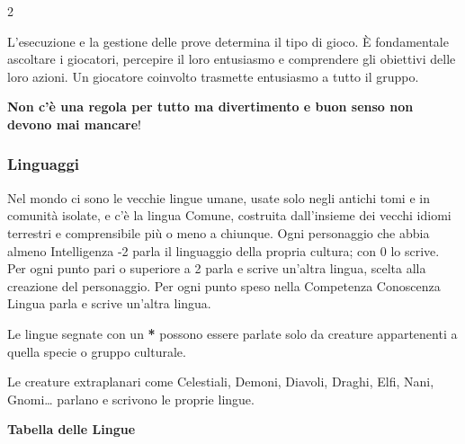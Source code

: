 \begin{multicols}{2}
\begin{narratore}
	L'esecuzione e la gestione delle prove determina il tipo di gioco. È fondamentale ascoltare i giocatori, percepire il loro entusiasmo e comprendere gli obiettivi delle loro azioni. Un giocatore coinvolto trasmette entusiasmo a tutto il gruppo.


	\textbf{Non c'è una regola per tutto ma divertimento e buon senso non devono mai mancare}!
\end{narratore}


\titlespacing*{\subsubsection}{0pt}{0.5em}{0.5em}\subsubsection*{Linguaggi}\hypertarget{linguaggi}{}\label{linguaggi}

Nel mondo ci sono le vecchie lingue umane, usate solo negli antichi tomi e in comunità isolate, e c'è la lingua Comune, costruita dall'insieme dei vecchi idiomi terrestri e comprensibile più o meno a chiunque. Ogni personaggio che abbia almeno Intelligenza -2 parla il linguaggio della propria cultura; con 0 lo scrive. Per ogni punto pari o superiore a 2 parla e scrive un'altra lingua, scelta alla creazione del personaggio. Per ogni punto speso nella Competenza Conoscenza Lingua parla e scrive un'altra lingua.

Le lingue segnate con un \textbf{*} possono essere parlate solo da creature appartenenti a quella specie o gruppo culturale.

Le creature extraplanari come Celestiali, Demoni, Diavoli, Draghi, Elfi, Nani, Gnomi… parlano e scrivono le proprie lingue.

\smallskip

\textbf{Tabella delle Lingue}

\smallskip


\end{multicols}
